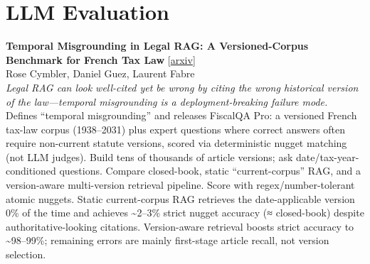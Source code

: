 \documentclass[12pt,letterpaper]{article}
\begin{document}
\medskip


\section*{LLM Evaluation}

{\small\textbf{Temporal Misgrounding in Legal RAG: A Versioned-Corpus Benchmark for French Tax Law}} {\scriptsize[\href{https://arxiv.org/abs/2608.09393}{arxiv}]}\\
{\scriptsize Rose Cymbler, Daniel Guez, Laurent Fabre}\\

{\small\textit{Legal RAG can look well-cited yet be wrong by citing the wrong historical version of the law---temporal misgrounding is a deployment-breaking failure mode.}}\\[1pt]
{\footnotesize Defines ``temporal misgrounding'' and releases FiscalQA Pro: a versioned French tax-law corpus (1938--2031) plus expert questions where correct answers often require non-current statute versions, scored via deterministic nugget matching (not LLM judges). Build tens of thousands of article versions; ask date/tax-year-conditioned questions. Compare closed-book, static ``current-corpus'' RAG, and a version-aware multi-version retrieval pipeline. Score with regex/number-tolerant atomic nuggets. Static current-corpus RAG retrieves the date-applicable version 0\% of the time and achieves \textasciitilde{}2--3\% strict nugget accuracy (≈ closed-book) despite authoritative-looking citations. Version-aware retrieval boosts strict accuracy to \textasciitilde{}98--99\%; remaining errors are mainly first-stage article recall, not version selection.}

\medskip
\end{document}
